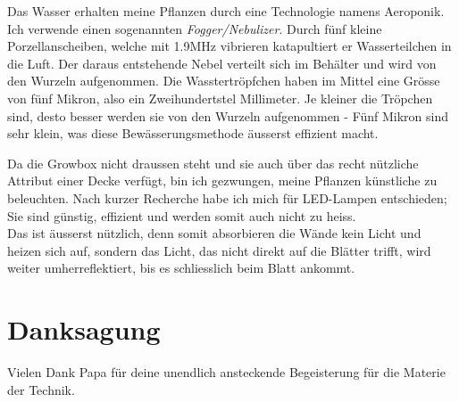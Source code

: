 \documentclass[12pt,titlepage,a4paper]{article}
\begin{document}
Das Wasser erhalten meine Pflanzen durch eine Technologie namens Aeroponik. Ich verwende einen sogenannten \textit{Fogger/Nebulizer}. Durch fünf kleine Porzellanscheiben, welche mit 1.9MHz vibrieren katapultiert er Wasserteilchen in die Luft. Der daraus entstehende Nebel verteilt sich im Behälter und wird von den Wurzeln aufgenommen. Die Wasstertröpfchen haben im Mittel eine Grösse von fünf Mikron, also ein Zweihundertstel  Millimeter. Je kleiner die Tröpchen sind, desto besser werden sie von den Wurzeln aufgenommen - Fünf Mikron sind sehr klein, was diese Bewässerungsmethode äusserst effizient macht.

Da die Growbox nicht draussen steht und sie auch über das recht nützliche Attribut einer Decke verfügt, bin ich gezwungen, meine Pflanzen künstliche zu beleuchten. Nach kurzer Recherche habe ich mich für LED-Lampen entschieden; Sie sind günstig, effizient und werden somit auch nicht zu heiss.\\

Das ist äusserst nützlich, denn somit absorbieren die Wände kein Licht und heizen sich auf, sondern das Licht, das nicht direkt auf die Blätter trifft, wird weiter umherreflektiert, bis es schliesslich beim Blatt ankommt. 

\section{Danksagung}
Vielen Dank Papa für deine unendlich ansteckende Begeisterung für die Materie der Technik.

%

\end{document}
